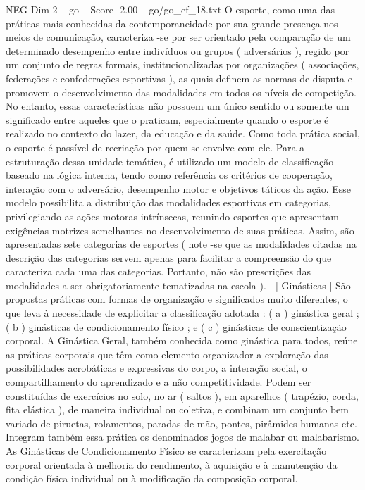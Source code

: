 \begin{textsample}{NEG Dim 2 – go – Score -2.00 – go/go\_ef\_18.txt}
O esporte, como uma das práticas mais conhecidas da contemporaneidade por sua grande presença nos meios de comunicação, caracteriza -se por ser orientado pela comparação de um determinado desempenho entre indivíduos ou grupos ( adversários ), regido por um conjunto de regras formais, institucionalizadas por organizações ( associações, federações e confederações esportivas ), as quais definem as normas de disputa e promovem o desenvolvimento das modalidades em todos os níveis de competição.
No entanto, essas características não possuem um único sentido ou somente um significado entre aqueles que o praticam, especialmente quando o esporte é realizado no contexto do lazer, da educação e da saúde.
Como toda prática social, o esporte é passível de recriação por quem se envolve com ele.
Para a estruturação dessa unidade temática, é utilizado um modelo de classificação baseado na lógica interna, tendo como referência os critérios de cooperação, interação com o adversário, desempenho motor e objetivos táticos da ação.
Esse modelo possibilita a distribuição das modalidades esportivas em categorias, privilegiando as ações motoras intrínsecas, reunindo esportes que apresentam exigências motrizes semelhantes no desenvolvimento de suas práticas.
Assim, são apresentadas sete categorias de esportes ( note -se que as modalidades citadas na descrição das categorias servem apenas para facilitar a compreensão do que caracteriza cada uma das categorias.
Portanto, não são prescrições das modalidades a ser obrigatoriamente tematizadas na escola ). | | Ginásticas | São propostas práticas com formas de organização e significados muito diferentes, o que leva à necessidade de explicitar a classificação adotada : ( a ) ginástica geral ; ( b ) ginásticas de condicionamento físico ; e ( c ) ginásticas de conscientização corporal.
A Ginástica Geral, também conhecida como ginástica para todos, reúne as práticas corporais que têm como elemento organizador a exploração das possibilidades acrobáticas e expressivas do corpo, a interação social, o compartilhamento do aprendizado e a não competitividade.
Podem ser constituídas de exercícios no solo, no ar ( saltos ), em aparelhos ( trapézio, corda, fita elástica ), de maneira individual ou coletiva, e combinam um conjunto bem variado de piruetas, rolamentos, paradas de mão, pontes, pirâmides humanas etc.
Integram também essa prática os denominados jogos de malabar ou malabarismo.
As Ginásticas de Condicionamento Físico se caracterizam pela exercitação corporal orientada à melhoria do rendimento, à aquisição e à manutenção da condição física individual ou à modificação da composição corporal.

\end{textsample}
